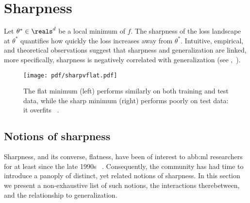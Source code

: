 \section{Sharpness}\label{sec:sharpness}

Let \(\theta^{\ast}\in\reals^{d}\) be a local minimum of \(f\).
The sharpness of the loss landscape at \(\theta^{\ast}\)
quantifies how quickly the loss increases away from \(\theta^{\ast}\).
Intuitive, empirical, and theoretical observations suggest that
sharpness and generalization are linked,
more specifically, sharpness is negatively correlated with generalization
(see ,~\citealt{keskarLargeBatchTrainingDeep2022}).
\begin{figure}[htb]
	\begin{center}
		\texttt{[image: pdf/sharpvflat.pdf]}
	\end{center}
	\caption{%
		The flat minimum (left) performs similarly on both training and test data,
		while the sharp minimum (right) performs poorly on test data: it overfits%
		~\cite{keskarLargeBatchTrainingDeep2022}.
	}\label{fig:sharpvflat}
\end{figure}

\subsection{Notions of sharpness}\label{sub:sharpness:notions}

Sharpness, and its converse, flatness,
have been of interest to \gls{abb:ml} researchers for at least since the late 1990s%
~\cite{hochreiterFlatMinima1997}.
Consequently, the community has had time to introduce a panoply
of distinct, yet related notions of sharpness.
In this section we present a non-exhaustive list of such notions,
the interactions therebetween, and the relationship to generalization.

